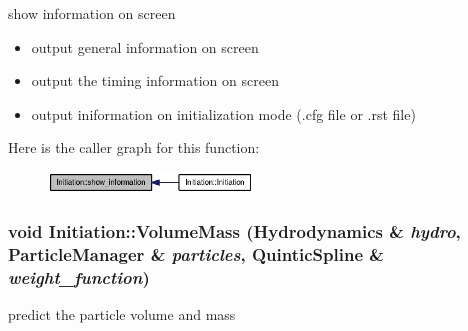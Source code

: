 show information on screen 



\begin{itemize}
\item output general information on screen\end{itemize}


\begin{itemize}
\item output the timing information on screen\end{itemize}


\begin{itemize}
\item output iniformation on initialization mode (.cfg file or .rst file) \end{itemize}


Here is the caller graph for this function:\nopagebreak
\begin{figure}[H]
\begin{center}
\leavevmode
\includegraphics[width=154pt]{classInitiation_cdbf1374b9b0f0b50a0bb1d9abf76293_icgraph}
\end{center}
\end{figure}
\hypertarget{classInitiation_e80adc7d2105ad67b766fd1127966df3}{
\subsubsection[{VolumeMass}]{\setlength{\rightskip}{0pt plus 5cm}void Initiation::VolumeMass ({\bf Hydrodynamics} \& {\em hydro}, \/  {\bf ParticleManager} \& {\em particles}, \/  {\bf QuinticSpline} \& {\em weight\_\-function})}}
\label{classInitiation_e80adc7d2105ad67b766fd1127966df3}


predict the particle volume and mass 



